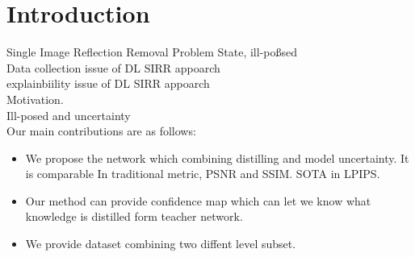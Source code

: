 \section{Introduction}\label{sec:intro}

Single Image Reflection Removal Problem State, ill-poßsed\\

Data collection issue of DL SIRR appoarch \\

explainbiility issue of DL SIRR appoarch  \\

Motivation.\\

Ill-posed and uncertainty \\


Our main contributions are as follows:
\begin{itemize}
\item We propose the network which combining distilling and model uncertainty. It is comparable In traditional metric, PSNR and SSIM. SOTA in LPIPS.
\item Our method can provide confidence map which can let we know what knowledge is distilled form teacher network.
\item We provide dataset combining two diffent level subset.
\end{itemize}